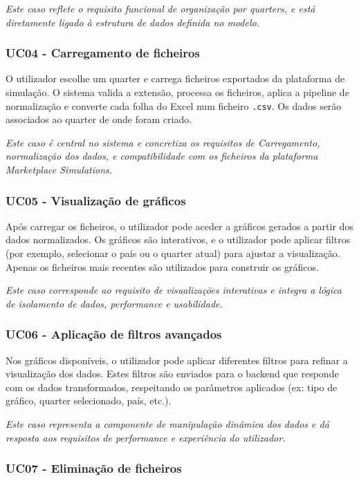 \textit{Este caso reflete o requisito funcional de organização por quarters, e está diretamente ligado à estrutura de dados definida no modelo.}

\subsubsection{UC04 - Carregamento de ficheiros}

O utilizador escolhe um quarter e carrega ficheiros exportados da plataforma de simulação. O sistema valida a extensão, processa os ficheiros, aplica a pipeline de normalização e converte cada folha do Excel num ficheiro \texttt{.csv}. Os dados serão associados ao quarter de onde foram criado.

\textit{Este caso é central no sistema e concretiza os requisitos de Carregamento, normalização dos dados, e compatibilidade com os ficheiros da plataforma Marketplace Simulations.}

\subsubsection{UC05 - Visualização de gráficos}

Após carregar os ficheiros, o utilizador pode aceder a gráficos gerados a partir dos dados normalizados. Os gráficos são interativos, e o utilizador pode aplicar filtros (por exemplo, selecionar o país ou o quarter atual) para ajustar a visualização. Apenas os ficheiros mais recentes são utilizados para construir os gráficos.

\textit{Este caso corresponde ao requisito de visualizações interativas e integra a lógica de isolamento de dados, performance e usabilidade.}

\subsubsection{UC06 - Aplicação de filtros avançados}

Nos gráficos disponíveis, o utilizador pode aplicar diferentes filtros para refinar a visualização dos dados. Estes filtros são enviados para o backend que responde com os dados transformados, respeitando os parâmetros aplicados (ex: tipo de gráfico, quarter selecionado, país, etc.).

\textit{Este caso representa a componente de manipulação dinâmica dos dados e dá resposta aos requisitos de performance e experiência do utilizador.}

\subsubsection{UC07 - Eliminação de ficheiros}

